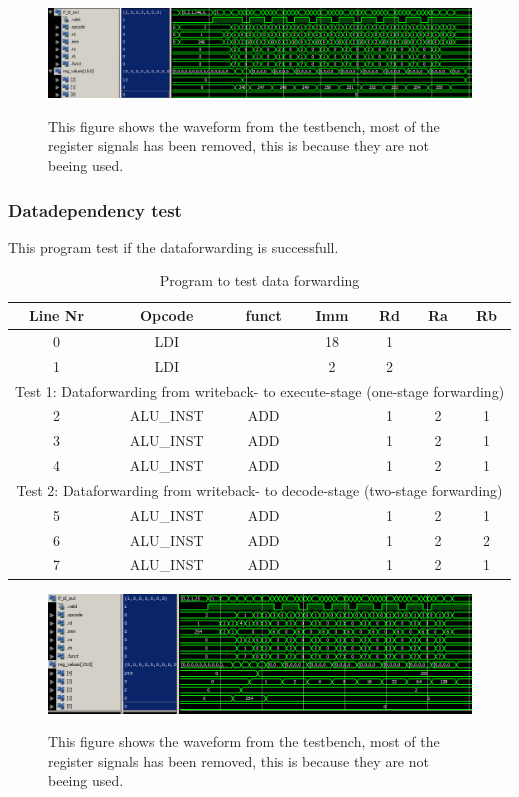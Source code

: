 \documentclass[11pt]{report}
\begin{document}
\begin{figure}
\centering
\includegraphics[width=.95\linewidth]{test1.png} \\
\caption{This figure shows the waveform from the testbench, 
most of the register signals has been removed, this is because they are not beeing used.}
\end{figure}


\subsubsection*{Datadependency test}

This program test if the dataforwarding is successfull.

\begin{table}[h]
  \centering
  \begin{tabular}{|c|c|c|c|c|c|c|}
    \hline
    Line Nr &	Opcode		&	funct	&	Imm	&	Rd	&	Ra	&	Rb	\\\hline
    	0	&	LDI			&			&	18	&	1	&		&		\\\hline
    	1	&	LDI			&			&	2	&	2	&		&		\\\hline
	\multicolumn{7}{|c|}{Test 1: Dataforwarding from writeback- to execute-stage (one-stage forwarding)}\\\hline
    	2	&	ALU\_INST	&	ADD		&		&	1	&	2	&	1	\\\hline
    	3	&	ALU\_INST	&	ADD		&		&	1	&	2	&	1	\\\hline
    	4	&	ALU\_INST	&	ADD		&		&	1	&	2	&	1	\\\hline
	\multicolumn{7}{|c|}{Test 2: Dataforwarding from writeback- to decode-stage (two-stage forwarding)}\\\hline
    	5	&	ALU\_INST	&	ADD		&		&	1	&	2	&	1	\\\hline
    	6	&	ALU\_INST	&	ADD		&		&	1	&	2	&	2	\\\hline
    	7	&	ALU\_INST	&	ADD		&		&	1	&	2	&	1	\\\hline
  \end{tabular}
  \caption{Program to test data forwarding}
\end{table}

\begin{figure}
\centering
\includegraphics[width=.95\linewidth]{test3.png} \\
\caption{This figure shows the waveform from the testbench, 
most of the register signals has been removed, this is because they are not beeing used.}
\end{figure}
\end{document}
